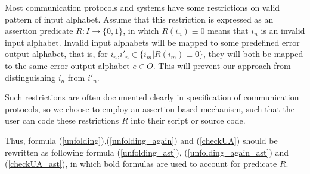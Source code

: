 \documentclass[journal]{IEEEtran}
\begin{document}
Most communication protocols and systems have some restrictions on valid pattern of input alphabet.
Assume that this restriction is expressed as an assertion predicate $R: I\to \{0,1\}$,
in which $R(i_{n})\equiv 0$ means that $i_n$ is an invalid input alphabet.
Invalid input alphabets will be mapped to some predefined error output alphabet,
that is,
for $i_n$,$i'_n\in \{i_m|R(i_m)\equiv 0\}$,
they will both be mapped to the same error output alphabet $e\in O$.
This will prevent our approach from distinguishing $i_n$ from $i'_n$.

Such restrictions are often documented clearly in specification of communication protocols,
so we choose to employ an assertion based mechanism,
such that the user can code these restrictions $R$ into their script or source code.

Thus, formula (\ref{unfolding}),(\ref{unfolding_again}) and (\ref{checkUA}) should be rewritten as following formula (\ref{unfolding_ast}), (\ref{unfolding_again_ast}) and (\ref{checkUA_ast}),
in which bold formulas are used to account for predicate $R$.

\begin{equation}\label{unfolding_ast}
\end{equation}

\begin{equation}\label{unfolding_again_ast}
\end{equation}

\begin{equation}\label{checkUA_ast}
\end{equation}
\end{document}
